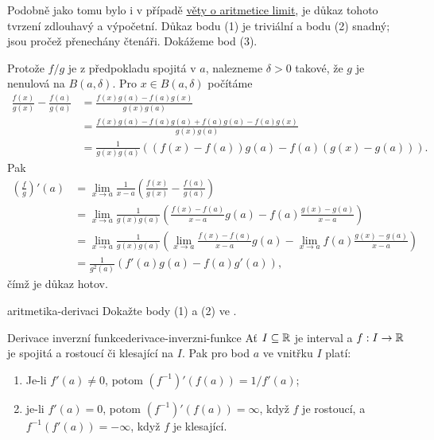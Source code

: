 \begin{thmproof}
 Podobně jako tomu bylo i v případě \hyperref[thm:aritmetika-limit]{věty o
 aritmetice limit}, je důkaz tohoto tvrzení zdlouhavý a výpočetní. Důkaz bodu
 (1) je triviální a bodu (2) snadný; jsou pročež přenechány čtenáři. Dokážeme
 bod (3).

 Protože $f / g$ je z předpokladu spojitá v $a$, nalezneme $\delta>0$ takové, že
 $g$ je nenulová na $B(a,\delta)$. Pro $x \in B(a,\delta)$ počítáme
 \begin{align*}
  \frac{f(x)}{g(x)} - \frac{f(a)}{g(a)} &= \frac{f(x)g(a) -
  f(a)g(x)}{g(x)g(a)}\\
                                        &= \frac{f(x)g(a) - f(a)g(a) + f(a)g(a)
                                        - f(a)g(x)}{g(x)g(a)}\\
                                        &= \frac{1}{g(x)g(a)}\left( (f(x) -
                                        f(a))g(a) - f(a)(g(x) - g(a)) \right).
 \end{align*}
 Pak
 \begin{align*}
  \left( \frac{f}{g} \right)'(a) &= \lim_{x \to a} \frac{1}{x-a}\left(
  \frac{f(x)}{g(x)} - \frac{f(a)}{g(a)} \right)\\
                                 &= \lim_{x \to a} \frac{1}{g(x)g(a)}\left(
                                 \frac{f(x) - f(a)}{x-a}g(a) - f(a) \frac{g(x) -
                                g(a)}{x-a} \right)\\
                                 &= \lim_{x \to a} \frac{1}{g(x)g(a)}\left(
                                 \lim_{x \to a} \frac{f(x) - f(a)}{x-a}g(a) -
                                \lim_{x \to a} f(a) \frac{g(x) - g(a)}{x-a}
                               \right)\\
                                 &= \frac{1}{g^2(a)}\left( f'(a)g(a) - f(a)g'(a)
                                 \right),
 \end{align*}
 čímž je důkaz hotov.
\end{thmproof}

\begin{exercise}{}{aritmetika-derivaci}
 Dokažte body (1) a (2) ve .
\end{exercise}

\begin{theorem}{Derivace inverzní funkce}{derivace-inverzni-funkce}
 Ať $I \subseteq \mathbb{R}$ je interval a $f:I \to \mathbb{R}$ je spojitá a rostoucí či
 klesající na $I$. Pak pro bod $a$ ve vnitřku $I$ platí:
 \begin{enumerate}
  \item Je-li $f'(a) \neq 0$, potom $(f^{-1})'(f(a)) = 1 / f'(a)$;
  \item je-li $f'(a) = 0$, potom $(f^{-1})'(f(a)) = \infty$, když $f$ je
   rostoucí, a $f^{-1}(f'(a)) = -\infty$, když $f$ je klesající.
 \end{enumerate}
\end{theorem}

